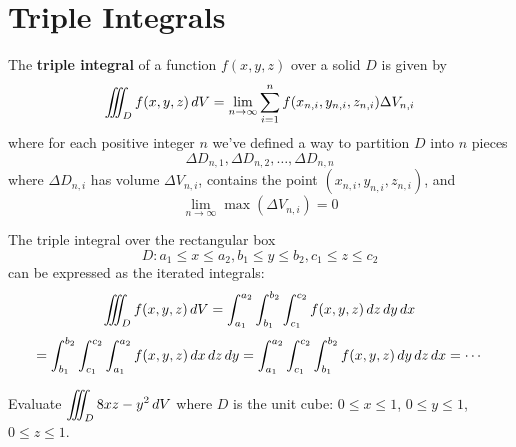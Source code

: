 \documentclass[letterpaper, twoside, 12pt]{book}
\begin{document}
          \begin{solution}

          \end{solution}

          \begin{contributors}

          \end{contributors}




\setcounter{section}{6}
\section{Triple Integrals} %

\begin{definition}
  The \textbf{triple integral} of a function $f(x,y,z)$ over a solid $D$ is
  given by
    \[
      \iiint_D f(x,y,z)\,d{V} =
      \lim_{n\to\infty}\sum_{i=1}^n f(x_{n,i},y_{n,i},z_{n,i})\Delta V_{n,i}
    \]
  where for each positive integer $n$ we've defined a way to partition
  $D$ into $n$ pieces
    \[
      \Delta D_{n,1},\Delta D_{n,2},\dots,\Delta D_{n,n}
    \]
  where $\Delta D_{n,i}$ has volume $\Delta V_{n,i}$,
  contains the point $(x_{n,i},y_{n,i},z_{n,i})$,
  and \[\lim_{n\to\infty} \max(\Delta V_{n,i}) = 0\]
\end{definition}

\begin{theorem}
  The triple integral over the rectangular box
    \[
      D: a_1\leq x\leq a_2, b_1\leq y\leq b_2, c_1\leq z\leq c_2
    \]
  can be expressed as the iterated integrals:
    \[
      \iiint_D f(x,y,z)\,d{V}
        =
      \int_{a_1}^{a_2}\int_{b_1}^{b_2}\int_{c_1}^{c_2}
      f(x,y,z)\,d{z}\,d{y}\,d{x}
    \]
    \[
      = \int_{b_1}^{b_2}\int_{c_1}^{c_2}\int_{a_1}^{a_2}
      f(x,y,z)\,d{x}\,d{z}\,d{y}
      = \int_{a_1}^{a_2}\int_{c_1}^{c_2}\int_{b_1}^{b_2}
      f(x,y,z)\,d{y}\,d{z}\,d{x}
      = \cdots
    \]
\end{theorem}

          \begin{problem}
            Evaluate $\displaystyle\iiint_D 8xz-y^2\,d{V}$ where
            $D$ is the unit cube: $0\leq x\leq 1$,
            $0\leq y\leq 1$, $0\leq z\leq 1$.
          \end{problem}

          \begin{solution}

          \end{solution}
\end{document}
